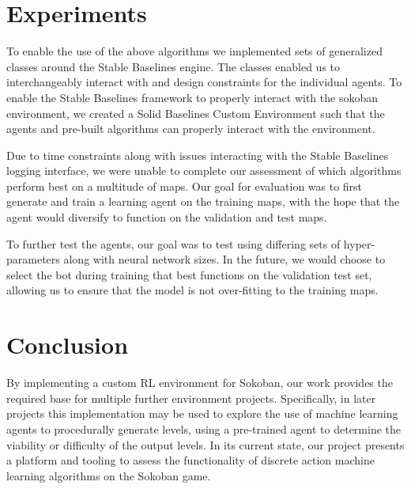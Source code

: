 \documentclass[twoside,11pt]{article}
\begin{document}
\section{Experiments}
To enable the use of the above algorithms we implemented sets of generalized classes around the Stable Baselines engine. The classes enabled us to interchangeably interact with and design constraints for the individual agents. To enable the Stable Baselines framework to properly interact with the sokoban environment, we created a Solid Baselines Custom Environment such that the agents and pre-built algorithms can properly interact with the environment.

Due to time constraints along with issues interacting with the Stable Baselines logging interface, we were unable to complete our assessment of which algorithms perform best on a multitude of maps. Our goal for evaluation was to first generate and train a learning agent on the training maps, with the hope that the agent would diversify to function on the validation and test maps.

To further test the agents, our goal was to test using differing sets of hyper-parameters along with neural network sizes. In the future, we would choose to select the bot during training that best functions on the validation test set, allowing us to ensure that the model is not over-fitting to the training maps.

\section{Conclusion}
By implementing a custom RL environment for Sokoban, our work provides the required base for multiple further environment projects. Specifically, in later projects this implementation may be used to explore the use of machine learning agents to procedurally generate levels, using a pre-trained agent to determine the viability or difficulty of the output levels. In its current state, our project presents a platform and tooling to assess the functionality of discrete action machine learning algorithms on the Sokoban game.




\end{document}
